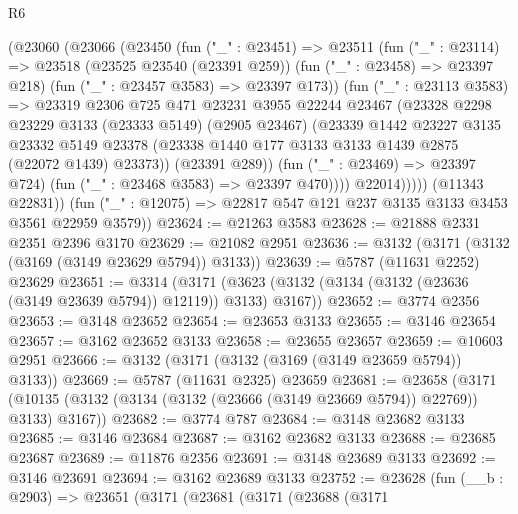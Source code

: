 \begin{lexlean}{R6}
\begin{coremodule}
              (@23060
                (@23066
                  (@23450
                    (fun ("_" : @23451) =>
                    @23511
                      (fun ("_" : @23114) =>
                      @23518
                        (@23525 @23540 (@23391 @259))
                        (fun ("_" : @23458) => @23397 @218)
                        (fun ("_" : @23457 @3583) => @23397 @173))
                      (fun ("_" : @23113 @3583) =>
                      @23319
                        @2306
                        @725
                        @471
                        @23231
                        @3955
                        @22244
                        @23467
                        (@23328
                          @2298
                          @23229
                          @3133
                          (@23333 @5149)
                          (@2905 @23467)
                          (@23339
                            @1442
                            @23227
                            @3135
                            @23332
                            @5149
                            @23378
                            (@23338 @1440 @177 @3133 @3133 @1439 @2875 (@22072 @1439) @23373))
                          (@23391 @289))
                        (fun ("_" : @23469) => @23397 @724)
                        (fun ("_" : @23468 @3583) => @23397 @470))))
                  @22014)))))
        (@11343 @22831))
      (fun ("_" : @12075) => @22817 @547 @121 @237 @3135 @3133 @3453 @3561 @22959 @3579))
@23624 := @21263 @3583
@23628 := @21888 @2331 @2351 @2396 @3170
@23629 := @21082 @2951
@23636 := @3132 (@3171 (@3132 (@3169 (@3149 @23629 @5794)) @3133))
@23639 := @5787 (@11631 @2252) @23629
@23651 := @3314
    (@3171 (@3623 (@3132 (@3134 (@3132 (@23636 (@3149 @23639 @5794)) @12119)) @3133) @3167))
@23652 := @3774 @2356
@23653 := @3148 @23652
@23654 := @23653 @3133
@23655 := @3146 @23654
@23657 := @3162 @23652 @3133
@23658 := @23655 @23657
@23659 := @10603 @2951
@23666 := @3132 (@3171 (@3132 (@3169 (@3149 @23659 @5794)) @3133))
@23669 := @5787 (@11631 @2325) @23659
@23681 := @23658
    (@3171 (@10135 (@3132 (@3134 (@3132 (@23666 (@3149 @23669 @5794)) @22769)) @3133) @3167))
@23682 := @3774 @787
@23684 := @3148 @23682 @3133
@23685 := @3146 @23684
@23687 := @3162 @23682 @3133
@23688 := @23685 @23687
@23689 := @11876 @2356
@23691 := @3148 @23689 @3133
@23692 := @3146 @23691
@23694 := @3162 @23689 @3133
@23752 := @23628
    (fun (__b : @2903) =>
    @23651
      (@3171
        (@23681
          (@3171
            (@23688
              (@3171

\end{coremodule}
\end{lexlean}
